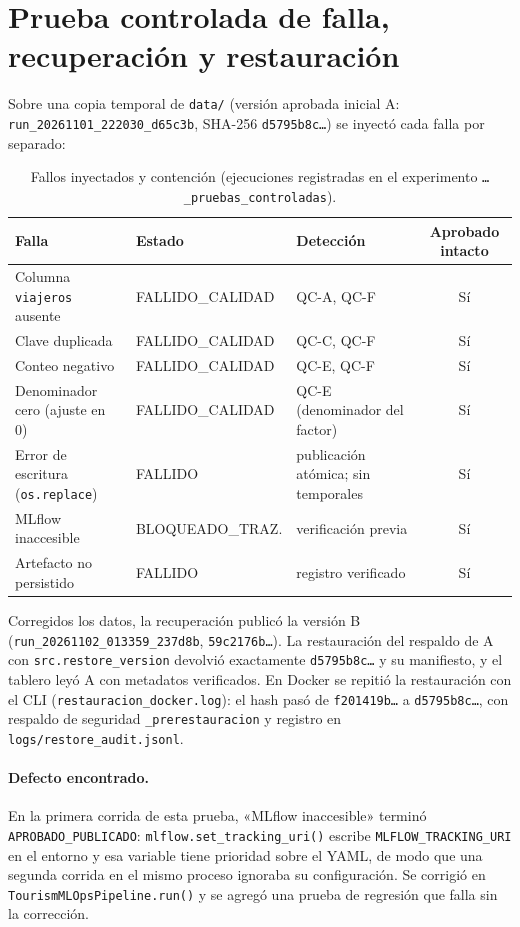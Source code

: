 \documentclass[11pt,a4paper]{article}
\newcommand{\cod}[1]{\texttt{\small #1}}
\begin{document}
\section{Prueba controlada de falla, recuperación y restauración}
Sobre una copia temporal de \cod{data/} (versión aprobada inicial A: \cod{run\_20261101\_222030\_d65c3b}, SHA-256 \cod{d5795b8c\ldots}) se inyectó cada falla por separado:
\begin{table}[H]\centering\small
\caption{Fallos inyectados y contención (ejecuciones registradas en el experimento \cod{\ldots\_pruebas\_controladas}).}
\begin{tabularx}{\textwidth}{@{}LlLc@{}}\toprule
Falla & Estado & Detección & Aprobado intacto\\\midrule
Columna \cod{viajeros} ausente & FALLIDO\_CALIDAD & QC-A, QC-F & Sí\\
Clave duplicada & FALLIDO\_CALIDAD & QC-C, QC-F & Sí\\
Conteo negativo & FALLIDO\_CALIDAD & QC-E, QC-F & Sí\\
Denominador cero (ajuste en 0) & FALLIDO\_CALIDAD & QC-E (denominador del factor) & Sí\\
Error de escritura (\cod{os.replace}) & FALLIDO & publicación atómica; sin temporales & Sí\\
MLflow inaccesible & BLOQUEADO\_TRAZ. & verificación previa & Sí\\
Artefacto no persistido & FALLIDO & registro verificado & Sí\\
\bottomrule\end{tabularx}
\end{table}
Corregidos los datos, la recuperación publicó la versión B (\cod{run\_20261102\_013359\_237d8b}, \cod{59c2176b\ldots}). La restauración del respaldo de A con \cod{src.restore\_version} devolvió exactamente \cod{d5795b8c\ldots} y su manifiesto, y el tablero leyó A con metadatos verificados. En Docker se repitió la restauración con el CLI (\cod{restauracion\_docker.log}): el hash pasó de \cod{f201419b\ldots} a \cod{d5795b8c\ldots}, con respaldo de seguridad \cod{\_prerestauracion} y registro en \cod{logs/restore\_audit.jsonl}.

\paragraph{Defecto encontrado.} En la primera corrida de esta prueba, «MLflow inaccesible» terminó \cod{APROBADO\_PUBLICADO}: \cod{mlflow.set\_tracking\_uri()} escribe \cod{MLFLOW\_TRACKING\_URI} en el entorno y esa variable tiene prioridad sobre el YAML, de modo que una segunda corrida en el mismo proceso ignoraba su configuración. Se corrigió en \cod{TourismMLOpsPipeline.run()} y se agregó una prueba de regresión que falla sin la corrección.
\end{document}
